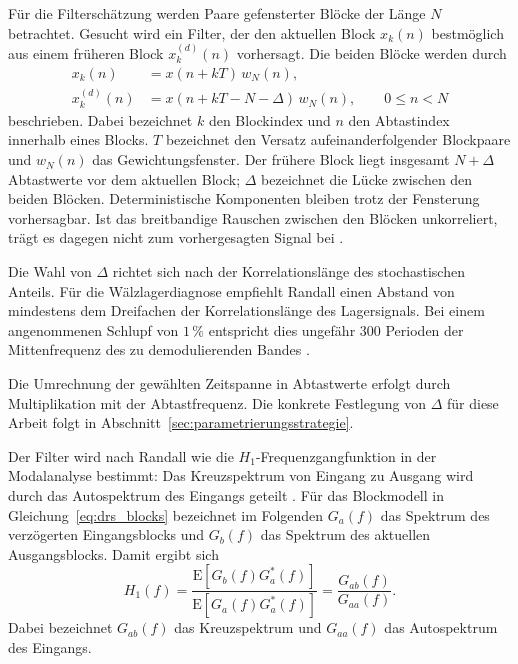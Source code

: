 Für die Filterschätzung werden Paare gefensterter Blöcke der Länge $N$
betrachtet. Gesucht wird ein Filter, der den aktuellen Block $x_k(n)$
bestmöglich aus einem früheren Block $x_k^{(d)}(n)$ vorhersagt. Die beiden
Blöcke werden durch
\begin{equation}
    \begin{aligned}
        x_k(n) &= x(n+kT)\,w_N(n), \\
        x_k^{(d)}(n) &= x(n+kT-N-\Delta)\,w_N(n),
        \qquad 0 \leq n < N
    \end{aligned}
    \label{eq:drs_blocks}
\end{equation}
beschrieben. Dabei bezeichnet $k$ den Blockindex und $n$ den Abtastindex
innerhalb eines Blocks. $T$ bezeichnet den Versatz aufeinanderfolgender Blockpaare
und $w_N(n)$ das Gewichtungsfenster. Der frühere Block liegt insgesamt
$N+\Delta$ Abtastwerte vor dem aktuellen Block; $\Delta$ bezeichnet die Lücke
zwischen den beiden Blöcken.
Deterministische Komponenten bleiben trotz der Fensterung vorhersagbar. Ist
das breitbandige Rauschen zwischen den Blöcken unkorreliert, trägt es dagegen
nicht zum vorhergesagten Signal bei
\cite[S.~104, Abschn.~2 und Abb.~1]
{antoniUnsupervisedNoiseCancellation2004}.

Die Wahl von $\Delta$ richtet sich nach der Korrelationslänge des
stochastischen Anteils. Für die Wälzlagerdiagnose empfiehlt Randall einen
Abstand von mindestens dem Dreifachen der Korrelationslänge des Lagersignals.
Bei einem angenommenen Schlupf von $1\,\%$ entspricht dies ungefähr
300 Perioden der Mittenfrequenz des zu demodulierenden Bandes
\cite[S.~277, Abschn.~7.3.2]
{randallVibrationbasedConditionMonitoring2022}.

Die Umrechnung der gewählten Zeitspanne in Abtastwerte erfolgt durch
Multiplikation mit der Abtastfrequenz. Die konkrete Festlegung von $\Delta$
für diese Arbeit folgt
in Abschnitt~\ref{sec:parametrierungsstrategie}.

Der Filter wird nach Randall wie die $H_1$-Frequenzgangfunktion in der
Modalanalyse bestimmt: Das Kreuzspektrum von Eingang zu Ausgang wird durch
das Autospektrum des Eingangs geteilt
\cite[S.~186, Abschn.~5.3.5, Gl.~(5.27)]
{randallVibrationbasedConditionMonitoring2022}.
Für das Blockmodell in Gleichung~\ref{eq:drs_blocks} bezeichnet im Folgenden
$G_a(f)$ das Spektrum des verzögerten Eingangsblocks und $G_b(f)$ das Spektrum
des aktuellen Ausgangsblocks. Damit ergibt sich
\begin{equation}
    H_1(f)
    = \frac{\mathrm{E}\!\left[G_b(f)G_a^*(f)\right]}
           {\mathrm{E}\!\left[G_a(f)G_a^*(f)\right]}
    = \frac{G_{ab}(f)}{G_{aa}(f)}.
    \label{eq:drs_h1_estimator}
\end{equation}
Dabei bezeichnet $G_{ab}(f)$ das Kreuzspektrum und $G_{aa}(f)$ das
Autospektrum des Eingangs.

